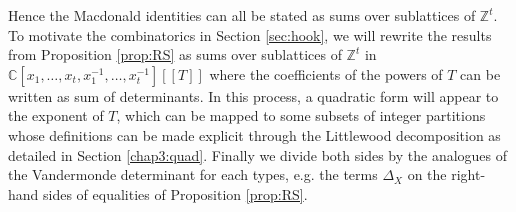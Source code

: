 \documentclass[11pt,letterpaper]{amsart}
\def\bbbz{\mathbb Z}
\numberwithin{equation}{section}
\numberwithin{df}{section}
\begin{document}
Hence the Macdonald identities can all be stated as sums over sublattices of $\bbbz^t$. To motivate the combinatorics in Section \ref{sec:hook}, we will rewrite the results from Proposition \ref{prop:RS} as sums over sublattices of $\mathbb{Z}^t$ in $\mathbb{C}[x_1,\dots,x_t,x_1^{-1},\dots,x_t^{-1}][[T]]$ where the coefficients of the powers of $T$ can be written as sum of determinants. In this process, a quadratic form will appear to the exponent of $T$, which can be mapped to some subsets of integer partitions whose definitions can be made explicit through the Littlewood decomposition as detailed in Section \ref{chap3:quad}. Finally we divide both sides by the analogues of the Vandermonde determinant for each types, e.g. the terms $\Delta_X$ on the right-hand sides of equalities of Proposition \ref{prop:RS}.
%
\end{document}
